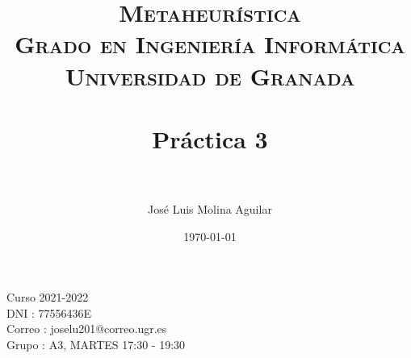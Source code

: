 

\everymath{\displaystyle}

\title{	
\normalfont \normalsize 
\textsc{\textbf{Metaheurística} \\ Grado en Ingeniería Informática \\ Universidad de Granada} \\ [25pt] %
\horrule{0.5pt} \\[0.4cm] %
\huge Práctica 3 \\ %
\horrule{2pt} \\[0.5cm] %
}

\author{José Luis Molina Aguilar} %

\date{\normalsize\today} %






\maketitle %
  \begin{large}
    \centering
  \vfill
  
  Curso 2021-2022\\
  DNI : 77556436E\\
  Correo : joselu201@correo.ugr.es\\
  Grupo : A3, MARTES 17:30 - 19:30
  \vfill
  \end{large}
\newpage %

\tableofcontents %

\listoffigures


\newpage




